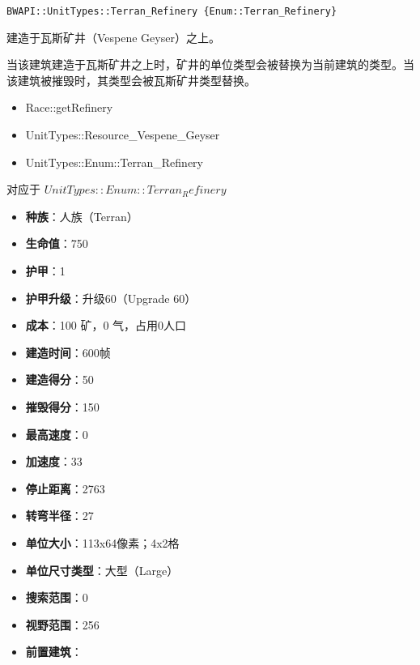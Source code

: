 \begin{tcolorbox}[colback=white, colframe=black!60!white, title=Terran\_Refinery(), arc=0mm]
    \begin{verbatim}
BWAPI::UnitTypes::Terran_Refinery {Enum::Terran_Refinery}
    \end{verbatim}
    建造于瓦斯矿井（Vespene Geyser）之上。
    \begin{note}
        当该建筑建造于瓦斯矿井之上时，矿井的单位类型会被替换为当前建筑的类型。当该建筑被摧毁时，其类型会被瓦斯矿井类型替换。
    \end{note}
    \begin{refer}
        \begin{itemize}
            \item Race::getRefinery
            \item UnitTypes::Resource\_Vespene\_Geyser
            \item UnitTypes::Enum::Terran\_Refinery
        \end{itemize}
    \end{refer}
    对应于  $ UnitTypes::Enum::Terran_Refinery $ 
    \begin{itemize}
        \item \textbf{种族}：人族（Terran）
        \item \textbf{生命值}：750
        \item \textbf{护甲}：1
        \item \textbf{护甲升级}：升级60（Upgrade 60）
        \item \textbf{成本}：100 矿，0 气，占用0人口
        \item \textbf{建造时间}：600帧
        \item \textbf{建造得分}：50
        \item \textbf{摧毁得分}：150
        \item \textbf{最高速度}：0
        \item \textbf{加速度}：33
        \item \textbf{停止距离}：2763
        \item \textbf{转弯半径}：27
        \item \textbf{单位大小}：113x64像素；4x2格
        \item \textbf{单位尺寸类型}：大型（Large）
        \item \textbf{搜索范围}：0
        \item \textbf{视野范围}：256
        \item \textbf{前置建筑}：
            \begin{itemize}

\end{itemize}
\end{itemize}
\end{tcolorbox}
